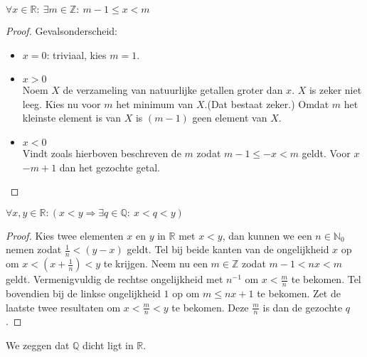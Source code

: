 \documentclass[main.tex]{subfiles}
\begin{document}
\begin{gev}
  \label{gev:z-omsluit-elk-r}
  $\forall x\in \mathbb{R}:\ \exists m \in \mathbb{Z}:\ m-1 \le x < m$

  \begin{proof}
    Gevalsonderscheid:
    \begin{itemize}
    \item $x = 0$: triviaal, kies $m=1$.
    \item $x > 0$\\
      Noem $X$ de verzameling van natuurlijke getallen groter dan $x$.
      $X$ is zeker niet leeg.
      Kies nu voor $m$ het minimum van $X$.(Dat bestaat zeker.) \waarom
      Omdat $m$ het kleinste element is van $X$ is $(m-1)$ geen element van $X$.
    \item $x < 0$\\
      Vindt zoals hierboven beschreven de $m$ zodat $m-1 \le -x < m$ geldt.
      Voor $x$ $-m+1$ dan het gezochte getal.\waarom
    \end{itemize}
  \end{proof}
\end{gev}

\begin{pr}
  \label{pr:q-dicht-in-r}
  $\forall x,y \in \mathbb{R}: (x<y \Rightarrow \exists q\in \mathbb{Q}:\ x<q<y)$

  \begin{proof}
    Kies twee elementen $x$ en $y$ in $\mathbb{R}$ met $x<y$, dan kunnen we een $n\in \mathbb{N}_{0}$ nemen zodat $\frac{1}{n}< (y-x)$ geldt.
    Tel bij beide kanten van de ongelijkheid $x$ op om $x<\left(x+\frac{1}{n}\right)<y$ te krijgen.
    Neem nu een $m\in \mathbb{Z}$ zodat $m-1<nx<m$ geldt.
    Vermenigvuldig de rechtse ongelijkheid met $n^{-1}$ om $x< \frac{m}{n}$ te bekomen.
    Tel bovendien bij de linkse ongelijkheid $1$ op om $m \le nx+1$ te bekomen.
    Zet de laatste twee resultaten om $x < \frac{m}{n} < y$ te bekomen.
    Deze $\frac{m}{n}$ is dan de gezochte $q$.
  \end{proof}
\end{pr}

\begin{opm}
  We zeggen dat $\mathbb{Q}$ dicht ligt in $\mathbb{R}$.
\end{opm}
\end{document}
